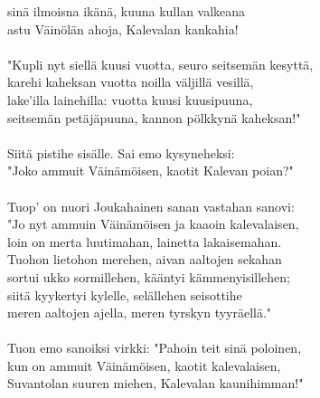sinä ilmoisna ikänä, kuuna kullan valkeana                  \\
astu Väinölän ahoja, Kalevalan kankahia!                    \\
                                                            \\
"Kupli nyt siellä kuusi vuotta, seuro seitsemän kesyttä,    \\
karehi kaheksan vuotta noilla väljillä vesillä,             \\
lake'illa lainehilla: vuotta kuusi kuusipuuna,              \\
seitsemän petäjäpuuna, kannon pölkkynä kaheksan!"           \\
                                                            \\
Siitä pistihe sisälle. Sai emo kysyneheksi:                 \\
"Joko ammuit Väinämöisen, kaotit Kalevan poian?"            \\
                                                            \\
Tuop' on nuori Joukahainen sanan vastahan sanovi:           \\
"Jo nyt ammuin Väinämöisen ja kaaoin kalevalaisen,          \\
loin on merta luutimahan, lainetta lakaisemahan.            \\
Tuohon lietohon merehen, aivan aaltojen sekahan             \\
sortui ukko sormillehen, kääntyi kämmenyisillehen;          \\
siitä kyykertyi kylelle, selällehen seisottihe              \\
meren aaltojen ajella, meren tyrskyn tyyräellä."            \\
                                                            \\
Tuon emo sanoiksi virkki: "Pahoin teit sinä poloinen,       \\
kun on ammuit Väinämöisen, kaotit kalevalaisen,             \\
Suvantolan suuren miehen, Kalevalan kaunihimman!"           \\